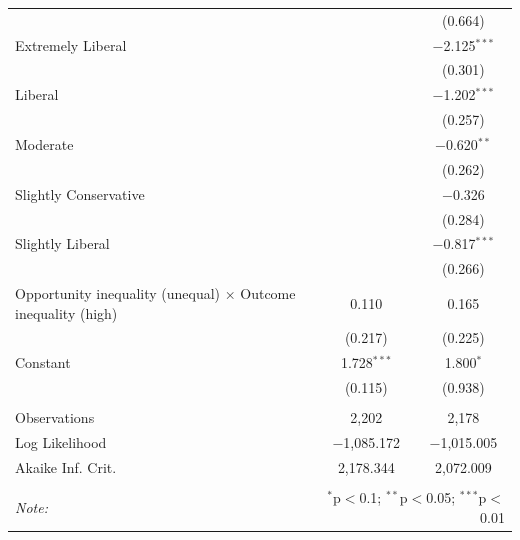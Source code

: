 \begin{table}[H]
\begin{tabular}{@{\extracolsep{5pt}}lcc}
  &  & (0.664) \\ 
  Extremely Liberal &  & $-$2.125$^{***}$ \\ 
  &  & (0.301) \\ 
  Liberal &  & $-$1.202$^{***}$ \\ 
  &  & (0.257) \\ 
  Moderate &  & $-$0.620$^{**}$ \\ 
  &  & (0.262) \\ 
  Slightly Conservative &  & $-$0.326 \\ 
  &  & (0.284) \\ 
  Slightly Liberal &  & $-$0.817$^{***}$ \\ 
  &  & (0.266) \\ 
  Opportunity inequality (unequal) × Outcome inequality (high) & 0.110 & 0.165 \\ 
  & (0.217) & (0.225) \\ 
  Constant & 1.728$^{***}$ & 1.800$^{*}$ \\ 
  & (0.115) & (0.938) \\ 
 \hline \\[-1.8ex] 
Observations & 2,202 & 2,178 \\ 
Log Likelihood & $-$1,085.172 & $-$1,015.005 \\ 
Akaike Inf. Crit. & 2,178.344 & 2,072.009 \\ 
\hline 
\hline \\[-1.8ex] 
\textit{Note:}  & \multicolumn{2}{r}{$^{*}$p$<$0.1; $^{**}$p$<$0.05; $^{***}$p$<$0.01} \\ 
\end{tabular} 
\end{table} 
